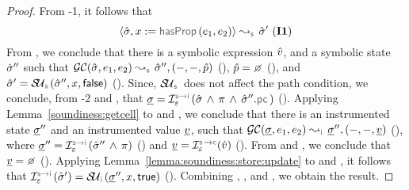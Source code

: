 \begin{proof}
\noindent {}
From \hyp{1}, it follows that 
$$\absbsemrule{\sstate, \jvar := \hasfield(\jsilexpr_1, \jsilexpr_2)}{\sstate'}{\symbolic} \text{ (\ieq{1})}$$
From , we conclude that there is a symbolic expression $\hat{v}$, and a symbolic state $\hat{\sigma}''$ such that 
$\absgetcellrule{\symbolic}{\sstate, \jsilexpr_1, \jsilexpr_2}{\sstate'', (-, -, \sexprp)}$ (), $\sexprp = \none$ (), 
and $\sstate' = \stupdt{\symbolic}(\sstate'', \jvar, \jfalse)$ (). 
Since, $\stupdt{\symbolic}$ does not affect the path condition, we conclude, from \hyp{2} and , that
$\istate = \interpret{\symbinst}{\senv}(\sstate \, \wedge \, \pc \, \wedge \, \sstate''.\pcsel)$ ().
Applying Lemma~\ref{soundiness:getcell} to  and , we conclude that
there is an instrumented state $\underline{\sigma}''$ and an instrumented value $\underline{v}$, such that 
$\absgetcellrule{\instrumented}{\istate, \jsilexpr_1, \jsilexpr_2}{\istate'', (-, -, \ival)}$ (), 
where $\istate'' = \interpret{\symbinst}{\senv}(\sstate'' \, \wedge \, \pc)$ () and $\ival = \interpret{\symbconc}{\senv}(\sexprv)$ (). 
 From  and , we conclude that $\ival = \none$ (). 
Applying Lemma~\ref{lemma:soundiness:store:update} to  and , it follows
that  $\interpret{\symbinst}{\senv}(\sstate') = \stupdt{\instrumented}(\istate'', \jvar, \jtrue)$ ().
Combining , , and , we obtain the result. 
%
\end{proof}

